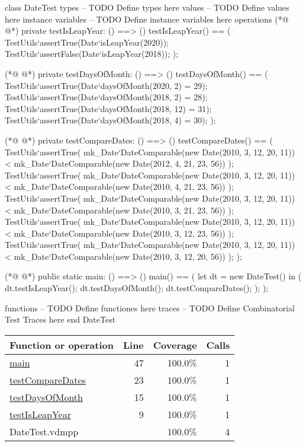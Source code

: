 \begin{vdmpp}[breaklines=true]
class DateTest
types
-- TODO Define types here
values
-- TODO Define values here
instance variables
-- TODO Define instance variables here
operations
(*@
\label{testIsLeapYear:9}
@*)
  private testIsLeapYear: () ==> ()
  testIsLeapYear() == ( 
   TestUtils`assertTrue(Date`isLeapYear(2020));
   TestUtils`assertFalse(Date`isLeapYear(2018));
  );
  
(*@
\label{testDaysOfMonth:15}
@*)
  private testDaysOfMonth: () ==> ()
  testDaysOfMonth() == ( 
   TestUtils`assertTrue(Date`daysOfMonth(2020, 2) = 29);
   TestUtils`assertTrue(Date`daysOfMonth(2018, 2) = 28);
   TestUtils`assertTrue(Date`daysOfMonth(2018, 12) = 31);
   TestUtils`assertTrue(Date`daysOfMonth(2018, 4) = 30);
  );
  
(*@
\label{testCompareDates:23}
@*)
  private testCompareDates: () ==> ()
  testCompareDates() == (
   TestUtils`assertTrue(
    mk_Date`DateComparable(new Date(2010, 3, 12, 20, 11)) < 
    mk_Date`DateComparable(new Date(2012, 4, 21, 23, 56))
   );
   TestUtils`assertTrue(
    mk_Date`DateComparable(new Date(2010, 3, 12, 20, 11)) <
    mk_Date`DateComparable(new Date(2010, 4, 21, 23, 56))
   );
   TestUtils`assertTrue(
    mk_Date`DateComparable(new Date(2010, 3, 12, 20, 11)) <
    mk_Date`DateComparable(new Date(2010, 3, 21, 23, 56))
   );
   TestUtils`assertTrue(
    mk_Date`DateComparable(new Date(2010, 3, 12, 20, 11)) <
    mk_Date`DateComparable(new Date(2010, 3, 12, 23, 56))
   );
   TestUtils`assertTrue(
    mk_Date`DateComparable(new Date(2010, 3, 12, 20, 11)) <
    mk_Date`DateComparable(new Date(2010, 3, 12, 20, 56))
   );   
  );
 
(*@
\label{main:47}
@*)
  public static main: () ==> ()
  main() == (
   let dt = new DateTest() in (
    dt.testIsLeapYear();
    dt.testDaysOfMonth();
    dt.testCompareDates();
   );
  );


functions
-- TODO Define functiones here
traces
-- TODO Define Combinatorial Test Traces here
end DateTest
\end{vdmpp}
\bigskip
\begin{longtable}{|l|r|r|r|}
\hline
Function or operation & Line & Coverage & Calls \\
\hline
\hline
\hyperref[main:47]{main} & 47&100.0\% & 1 \\
\hline
\hyperref[testCompareDates:23]{testCompareDates} & 23&100.0\% & 1 \\
\hline
\hyperref[testDaysOfMonth:15]{testDaysOfMonth} & 15&100.0\% & 1 \\
\hline
\hyperref[testIsLeapYear:9]{testIsLeapYear} & 9&100.0\% & 1 \\
\hline
\hline
DateTest.vdmpp & & 100.0\% & 4 \\
\hline
\end{longtable}

